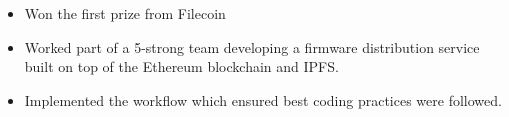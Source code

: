 \documentclass[8pt,a4paper]{altacv}
\begin{document}
\begin{itemize}
\item Won the first prize from Filecoin
\item Worked part of a 5-strong team developing a firmware distribution service built on top of the Ethereum blockchain and IPFS.
\item Implemented the workflow which ensured best coding practices were followed. 
\end{itemize}
\divider
\end{document}
